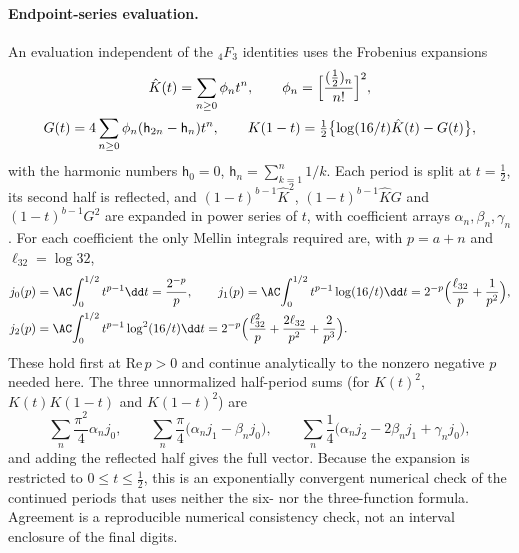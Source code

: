 \paragraph{Endpoint-series evaluation.}\label{sri:app:cform:endpoint} An evaluation independent of the
${}_4F_3$ identities uses the Frobenius expansions
\begin{equation}
\begin{gathered}
 \hat K(t)=\sum_{n\ge0}\phi_nt^n,\qquad \phi_n=\Bigl[\frac{(\frac12)_n}{n!}\Bigr]^2,\\
 G(t)=4\sum_{n\ge0}\phi_n(\mathsf h_{2n}-\mathsf h_n)t^n,\qquad
 K(1-t)=\tfrac12\bigl\{\log(16/t)\hat K(t)-G(t)\bigr\},
\end{gathered}
 \label{sri:eq:cform:frobenius}
\end{equation}
with the harmonic numbers $\mathsf h_0=0$, $\mathsf h_n=\sum_{k=1}^n1/k$. Each period is split at $t=\frac12$, its second
half is reflected, and $(1-t)^{b-1}\hat K^2$, $(1-t)^{b-1}\hat KG$ and $(1-t)^{b-1}G^2$ are expanded in power series of
$t$, with coefficient arrays $\alpha_n,\beta_n,\gamma_n$. For each coefficient the only Mellin integrals required are,
with $p=a+n$ and $\ell_{32}=\log32$,
\begin{equation}
\begin{aligned}
 j_0(p)&=\AC\!\int_0^{1/2}t^{p-1}\dd t=\frac{2^{-p}}p,\qquad
 j_1(p)=\AC\!\int_0^{1/2}t^{p-1}\log(16/t)\dd t=2^{-p}\Bigl(\frac{\ell_{32}}p+\frac1{p^2}\Bigr),\\
 j_2(p)&=\AC\!\int_0^{1/2}t^{p-1}\log^2(16/t)\dd t=2^{-p}\Bigl(\frac{\ell_{32}^2}p+\frac{2\ell_{32}}{p^2}+\frac2{p^3}\Bigr).
\end{aligned}
\end{equation}
These hold first at $\mathrm{Re}\,p>0$ and continue analytically to the nonzero negative $p$ needed here. The three
unnormalized half-period sums (for $K(t)^2$, $K(t)K(1-t)$ and $K(1-t)^2$) are
\begin{equation}
 \sum_n\frac{\pi^2}{4}\alpha_nj_0,\qquad\sum_n\frac\pi4\bigl(\alpha_nj_1-\beta_nj_0\bigr),\qquad
 \sum_n\frac14\bigl(\alpha_nj_2-2\beta_nj_1+\gamma_nj_0\bigr),
\end{equation}
and adding the reflected half gives the full vector. Because the expansion is restricted to $0\le t\le\frac12$, this is
an exponentially convergent numerical check of the continued periods that uses neither the six- nor the
three-function formula. Agreement is a reproducible numerical consistency check, not an interval enclosure of the
final digits.

